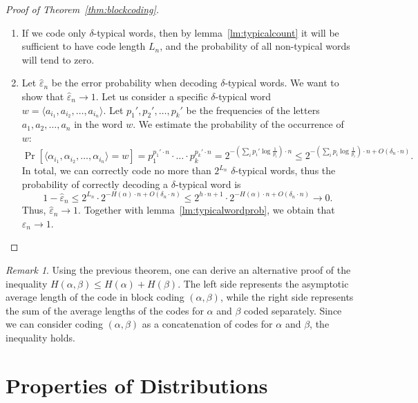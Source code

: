 \documentclass[12pt,sans]{article}
\newcommand{\seqn}[2]{{#1}_1,{#1}_2,\dotsc,{#1}_{#2}}
\newcommand{\seqin}[3]{{#1}_{{#2}_1},{#1}_{{#2}_2},\dotsc,{#1}_{{#2}_{#3}}}
\theoremstyle{definition}
\theoremstyle{plain}
\theoremstyle{remark}
\newtheorem{remark}{Remark}[section]
\begin{document}
\begin{proof}[Proof of Theorem~\ref{thm:blockcoding}] \mbox{}
    \begin{enumerate}
        \item If we code only \(\delta\)-typical words, then by lemma~\ref{lm:typicalcount} it will be sufficient to have code length \(L_n\), and the probability of all non-typical words will tend to zero.

        \item Let \(\hat\varepsilon_n\) be the error probability when decoding \(\delta\)-typical words.
        We want to show that \(\hat\varepsilon_n \to 1\).
        Let us consider a specific \(\delta\)-typical word \(w=\langle\seqin{a}{i}{n}\rangle\). Let \(p_1', p_2', \dotsc, p_k'\) be the frequencies of the letters \(\seqn{a}{n}\) in the word \(w\).
        We estimate the probability of the occurrence of \(w\):
        \[
        \Pr[\langle\seqin{\alpha}{i}{n}\rangle = w] =
        p_1^{p_1' \cdot n} \cdot \dotsc \cdot p_k^{p_k' \cdot n}
        =   2^{-(\sum_i p_i' \log \frac{1}{p_i}) \cdot n}
        \le 2^{-(\sum_i p_i \log \frac{1}{p_i}) \cdot n + O(\delta_n \cdot n)}.
        \]
        In total, we can correctly code no more than \(2^{L_n}\) \(\delta\)-typical words, thus the probability of correctly decoding a \(\delta\)-typical word is
        \[
        1 - \hat\varepsilon_n \le 2^{L_n} \cdot 2^{-H(\alpha) \cdot n + O(\delta_n \cdot n)} \le
        2^{h \cdot n + 1} \cdot 2^{-H(\alpha) \cdot n + O(\delta_n \cdot n)}
        \to 0.
        \]
        Thus, \(\hat\varepsilon_n \to 1\). Together with lemma~\ref{lm:typicalwordprob}, we obtain that \(\varepsilon_n \to 1\). \qedhere
    \end{enumerate}
\end{proof}
\begin{remark}
    Using the previous theorem, one can derive an alternative proof of the inequality \(H(\alpha, \beta) \le H(\alpha) + H(\beta)\). The left side represents the asymptotic average length of the code in block coding \((\alpha, \beta)\), while the right side represents the sum of the average lengths of the codes for \(\alpha\) and \(\beta\) coded separately. Since we can consider coding \((\alpha, \beta)\) as a concatenation of codes for \(\alpha\) and \(\beta\), the inequality holds.
\end{remark}

\section{Properties of Distributions}
\end{document}
